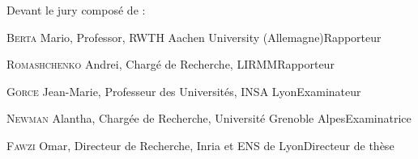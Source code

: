 \documentclass[11pt,a4paper]{book}
\begin{document}
\fontsize{12pt}{14pt}\selectfont
Devant le jury composé de :
\bigskip

\fontsize{11pt}{13pt}\selectfont



\textsc{Berta} Mario, Professor, RWTH Aachen University (Allemagne)\hfill  Rapporteur

\medskip

\textsc{Romashchenko} Andrei, Chargé de Recherche, LIRMM\hfill Rapporteur

\medskip

\textsc{Gorce} Jean-Marie, Professeur des Universités, INSA Lyon\hfill  Examinateur

\medskip

\textsc{Newman} Alantha, Chargée de Recherche, Université Grenoble Alpes\hfill Examinatrice

\bigskip

\textsc{Fawzi} Omar, Directeur de Recherche, Inria et ENS de Lyon\hfill Directeur de thèse



\newpage
\end{document}
